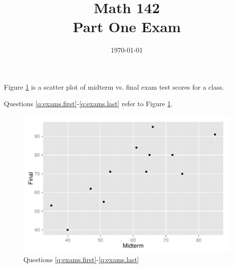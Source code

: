 \documentclass[letterpaper, landscape]{exam}
\title{Math 142 \\ Part One Exam}
\date{\today}
\author{}
\begin{document}
  \maketitle

  \begin{center}
    \gradetable[h][pages]
  \end{center}


  Figure \ref{fig:exams} is a scatter plot of midterm vs. final exam test scores
  for a class.

  Questions \ref{q:exams.first}-\ref{q:exams.last} refer to Figure \ref{fig:exams}.  

  \begin{figure}[H]
    \centering
    \includegraphics[scale = 0.5]{figures/exams_scatter.pdf}
    \caption{Questions \ref{q:exams.first}-\ref{q:exams.last}}
    \label{fig:exams}
  \end{figure}
\end{document}
